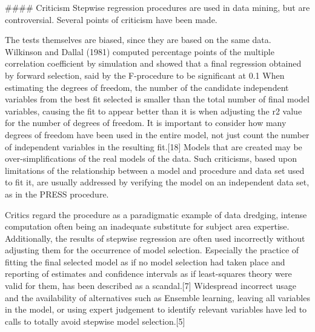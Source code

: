 #### Criticism
Stepwise regression procedures are used in data mining, but are controversial. Several points of criticism have been made.

The tests themselves are biased, since they are based on the same data. Wilkinson and Dallal (1981) computed percentage points of the multiple correlation coefficient by simulation and showed that a final regression obtained by forward selection, said by the F-procedure to be significant at 0.1%
When estimating the degrees of freedom, the number of the candidate independent variables from the best fit selected is smaller than the total number of final model variables, causing the fit to appear better than it is when adjusting the r2 value for the number of degrees of freedom. It is important to consider how many degrees of freedom have been used in the entire model, not just count the number of independent variables in the resulting fit.[18]
Models that are created may be over-simplifications of the real models of the data.
Such criticisms, based upon limitations of the relationship between a model and procedure and data set used to fit it, are usually addressed by verifying the model on an independent data set, as in the PRESS procedure.

Critics regard the procedure as a paradigmatic example of data dredging, intense computation often being an inadequate substitute for subject area expertise. Additionally, the results of stepwise regression are often used incorrectly without adjusting them for the occurrence of model selection. Especially the practice of fitting the final selected model as if no model selection had taken place and reporting of estimates and confidence intervals as if least-squares theory were valid for them, has been described as a scandal.[7] Widespread incorrect usage and the availability of alternatives such as Ensemble learning, leaving all variables in the model, or using expert judgement to identify relevant variables have led to calls to totally avoid stepwise model selection.[5]

